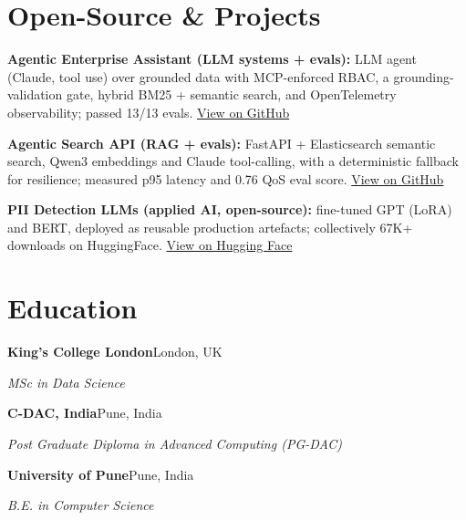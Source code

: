 \documentclass[10pt,a4paper]{article}
\begin{document}
\section{Open-Source \& Projects}
\begin{tight}
  \item \textbf{Agentic Enterprise Assistant (LLM systems + evals):} LLM agent (Claude, tool use) over grounded data with MCP-enforced RBAC, a grounding-validation gate, hybrid BM25 + semantic search, and OpenTelemetry observability; passed 13/13 evals. \href{https://github.com/abhijeetscode/Agentic-Enterprise-Assistant}{View on GitHub}
  \item \textbf{Agentic Search API (RAG + evals):} FastAPI + Elasticsearch semantic search, Qwen3 embeddings and Claude tool-calling, with a deterministic fallback for resilience; measured p95 latency and 0.76 QoS eval score. \href{https://github.com/abhijeetscode/search-agent}{View on GitHub}
  \item \textbf{PII Detection LLMs (applied AI, open-source):} fine-tuned GPT (LoRA) and BERT, deployed as reusable production artefacts; collectively 67K+ downloads on HuggingFace. \href{https://huggingface.co/ab-ai/pii_model}{View on Hugging Face}
\end{tight}

\section{Education}
{\color{company}\bfseries King's College London}\hfill {\color{muted}London, UK}\par
{\itshape MSc in Data Science}\par\vspace{2pt}
{\color{company}\bfseries C-DAC, India}\hfill {\color{muted}Pune, India}\par
{\itshape Post Graduate Diploma in Advanced Computing (PG-DAC)}\par\vspace{2pt}
{\color{company}\bfseries University of Pune}\hfill {\color{muted}Pune, India}\par
{\itshape B.E. in Computer Science}\par
\end{document}
